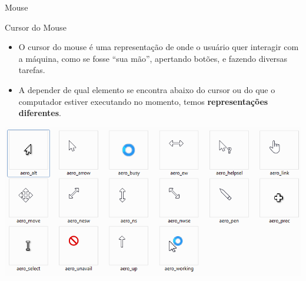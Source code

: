 \begin{frame}{Mouse}
	\begin{block}{Cursor do Mouse}
		\begin{itemize}
			\item O cursor do mouse é uma representação de onde o usuário quer interagir com a máquina, como se fosse ``sua mão'', apertando botões, e fazendo diversas tarefas.
			\item A depender de qual elemento se encontra abaixo do cursor ou do que o computador estiver executando no momento, temos \textbf{representações diferentes}.
		\end{itemize}
	\end{block}

	\centering
	\includegraphics[width=0.6\linewidth]{Figuras/Ch02/fig14}
\end{frame}


